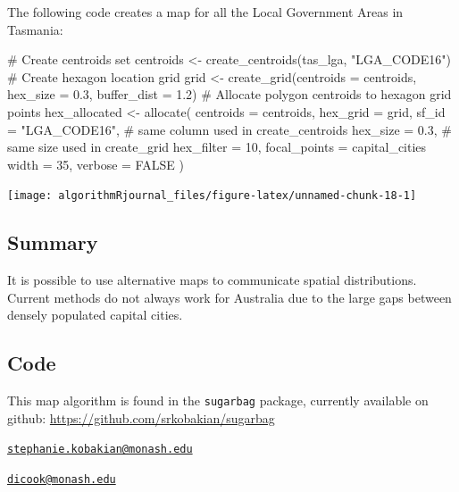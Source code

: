The following code creates a map for all the Local Government Areas in
Tasmania:

\begin{Schunk}
\begin{Sinput}
# Create centroids set
centroids <- create_centroids(tas_lga, "LGA_CODE16")
# Create hexagon location grid
grid <- create_grid(centroids = centroids,
    hex_size = 0.3,
    buffer_dist = 1.2)
# Allocate polygon centroids to hexagon grid points
hex_allocated <- allocate(
  centroids = centroids,
  hex_grid = grid,
  sf_id = "LGA_CODE16",
  # same column used in create_centroids
  hex_size = 0.3,
  # same size used in create_grid
  hex_filter = 10,
  focal_points = capital_cities %
  width = 35,
  verbose = FALSE
)
\end{Sinput}
\end{Schunk}

\begin{Schunk}

\texttt{[image: algorithmRjournal\_files/figure-latex/unnamed-chunk-18-1]} \end{Schunk}

\hypertarget{summary}{%
\subsection{Summary}\label{summary}}

It is possible to use alternative maps to communicate spatial
distributions. Current methods do not always work for Australia due to
the large gaps between densely populated capital cities.

\hypertarget{code}{%
\subsection{Code}\label{code}}

This map algorithm is found in the \texttt{sugarbag} package, currently
available on github: \url{https://github.com/srkobakian/sugarbag}




\address{%
Stephanie Kobakian\\
Queensland University of Technology\\
\\
}
\href{mailto:stephanie.kobakian@monash.edu}{\nolinkurl{stephanie.kobakian@monash.edu}}

\address{%
Dianne Cook\\
Monash University\\
\\
}
\href{mailto:dicook@monash.edu}{\nolinkurl{dicook@monash.edu}}

